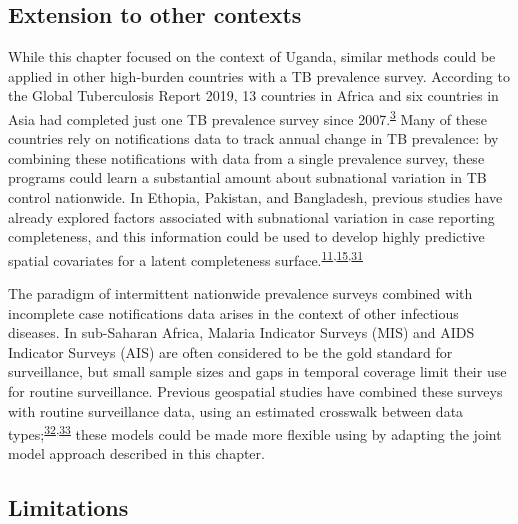 \documentclass[
]{article}
\begin{document}
\hypertarget{extension-to-other-contexts}{%
\subsection{Extension to other contexts}\label{extension-to-other-contexts}}

While this chapter focused on the context of Uganda, similar methods could be applied in other high-burden countries with a TB prevalence survey. According to the Global Tuberculosis Report 2019, 13 countries in Africa and six countries in Asia had completed just one TB prevalence survey since 2007.\textsuperscript{\protect\hyperlink{ref-WorldHealthOrganization2019}{3}} Many of these countries rely on notifications data to track annual change in TB prevalence: by combining these notifications with data from a single prevalence survey, these programs could learn a substantial amount about subnational variation in TB control nationwide. In Ethopia, Pakistan, and Bangladesh, previous studies have already explored factors associated with subnational variation in case reporting completeness, and this information could be used to develop highly predictive spatial covariates for a latent completeness surface.\textsuperscript{\protect\hyperlink{ref-Rood2019}{11},\protect\hyperlink{ref-VanGurp2020}{15},\protect\hyperlink{ref-Shaweno2017}{31}}

The paradigm of intermittent nationwide prevalence surveys combined with incomplete case notifications data arises in the context of other infectious diseases. In sub-Saharan Africa, Malaria Indicator Surveys (MIS) and AIDS Indicator Surveys (AIS) are often considered to be the gold standard for surveillance, but small sample sizes and gaps in temporal coverage limit their use for routine surveillance. Previous geospatial studies have combined these surveys with routine surveillance data, using an estimated crosswalk between data types;\textsuperscript{\protect\hyperlink{ref-Dwyer-Lindgren2019}{32},\protect\hyperlink{ref-Lucas2019}{33}} these models could be made more flexible using by adapting the joint model approach described in this chapter.

\hypertarget{limitations}{%
\subsection{Limitations}\label{limitations}}
\end{document}
